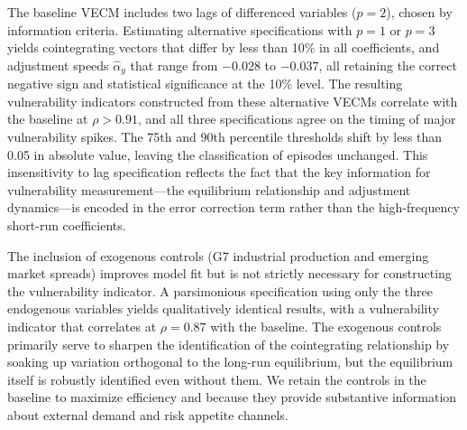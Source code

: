 \documentclass[12pt,a4paper]{article}
\numberwithin{equation}{section}
\theoremstyle{definition}
\theoremstyle{remark}
\begin{document}
The baseline VECM includes two lags of differenced variables ($p=2$), chosen by information criteria. Estimating alternative specifications with $p=1$ or $p=3$ yields cointegrating vectors that differ by less than 10\% in all coefficients, and adjustment speeds $\hat{\alpha}_y$ that range from $-0.028$ to $-0.037$, all retaining the correct negative sign and statistical significance at the 10\% level. The resulting vulnerability indicators constructed from these alternative VECMs correlate with the baseline at $\rho > 0.91$, and all three specifications agree on the timing of major vulnerability spikes. The 75th and 90th percentile thresholds shift by less than 0.05 in absolute value, leaving the classification of episodes unchanged. This insensitivity to lag specification reflects the fact that the key information for vulnerability measurement---the equilibrium relationship and adjustment dynamics---is encoded in the error correction term rather than the high-frequency short-run coefficients.

The inclusion of exogenous controls (G7 industrial production and emerging market spreads) improves model fit but is not strictly necessary for constructing the vulnerability indicator. A parsimonious specification using only the three endogenous variables yields qualitatively identical results, with a vulnerability indicator that correlates at $\rho=0.87$ with the baseline. The exogenous controls primarily serve to sharpen the identification of the cointegrating relationship by soaking up variation orthogonal to the long-run equilibrium, but the equilibrium itself is robustly identified even without them. We retain the controls in the baseline to maximize efficiency and because they provide substantive information about external demand and risk appetite channels.
\end{document}
